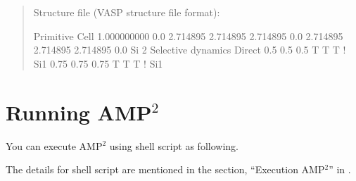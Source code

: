 \documentclass[letterpaper,10pt,english]{sphinxmanual}
\begin{document}
\begin{quote}
\begin{sphinxVerbatim}[commandchars=\\\{\}]
                                  
                                  
\end{sphinxVerbatim}

Structure file (VASP structure file format):

\begin{sphinxVerbatim}[commandchars=\\\{\}]
Primitive Cell
   1.000000000
      0.0         2.714895    2.714895
      2.714895    0.0         2.714895
      2.714895    2.714895    0.0
    Si
    2
Selective dynamics
Direct
    0.5     0.5     0.5   T  T  T ! Si1
    0.75    0.75    0.75  T  T  T ! Si1
\end{sphinxVerbatim}
\end{quote}


\section{Running AMP$^{\text{2}}$}
\label{\detokenize{Overview/Overview:running-amp2}}
You can execute AMP$^{\text{2}}$ using shell script as following.

\begin{sphinxVerbatim}[commandchars=\\\{\}]
 
\end{sphinxVerbatim}

The details for shell script are mentioned in the section, “Execution AMP$^{\text{2}}$” in {\hyperref[\detokenize{Installation/Installation::doc}]{}}.
\end{document}
